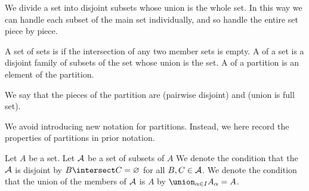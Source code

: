 
\sbasic










\sstart
{}


We divide a set into
disjoint subsets whose
union is the whole set.
In this way we can handle
each subset of the main set
individually, and so handle
the entire set piece by piece.


A set of sets is
if the intersection of any two
member sets is empty.
A  of
a set is a disjoint family of
subsets of the set
whose union is the set.
A
of a partition is an
element of the partition.

We say that the pieces
of the partition
are
 (pairwise disjoint)
and
 (union is full set).


We avoid introducing new notation
for partitions.
Instead,
we here record the properties
of partitions in prior notation.

Let $A$ be a set.
Let $\mathcal{A}$ be a set of
subsets of $A$
We denote the condition that
the $\mathcal{A}$ is disjoint by
$B \intersect C = \emptyset$ for all
$B, C \in \mathcal{A}$.
We denote the condition that the union
of the members of $\mathcal{A}$ is $A$ by
$\union_{\alpha \in I} A_{\alpha} = A$.

\strats
\strats
